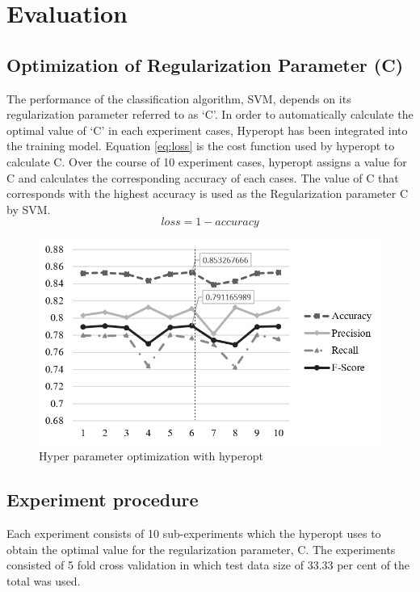 \documentclass[fleqn --11pt --twoside]{IOEGC2016} %
\begin{document}

\section{Evaluation}
\subsection{Optimization of Regularization Parameter (C)}
The performance of the classification algorithm, SVM, depends on its regularization parameter referred to as `C'. In order to automatically calculate the optimal value of `C' in each experiment cases, Hyperopt has been integrated into the training model. Equation \ref{eq:loss} is the cost function used by hyperopt to calculate C. Over the course of 10 experiment cases, hyperopt assigns a value for C and calculates the corresponding accuracy of each cases. The value of C that corresponds with the highest accuracy is used as the Regularization parameter C by SVM. 
\begin{equation}
loss= 1-accuracy
\label{eq:loss}
\end{equation} 
\begin{figure}[!ht]
\centering
\includegraphics[width=\linewidth]{assets/hyperopt}
\caption{Hyper parameter optimization with hyperopt}
\label{fig:hyperopt}
\end{figure}
\subsection{Experiment procedure}
Each experiment consists of 10 sub-experiments which the hyperopt uses to obtain the optimal value for the regularization parameter, C. The experiments consisted of 5 fold cross validation in which test data size of 33.33 per cent of the total was used.
\end{document}
